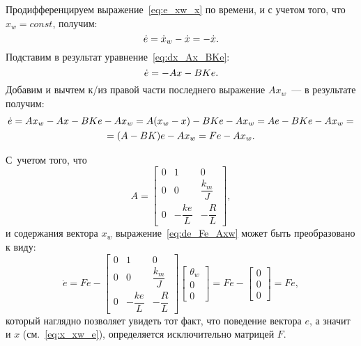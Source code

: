 \documentclass[12pt,a4paper,openany]{extarticle}
\begin{document}
Продифференцируем выражение~\eqref{eq:e_xw_x} по времени, и с учетом того, что $x_w=const$, получим:
\begin{equation}
\dot{e} = \dot{x}_w - \dot{x} = -\dot{x}\ldotp
\end{equation}
Подставим в результат уравнение~\eqref{eq:dx_Ax_BKe}:
\begin{equation}
\dot{e} = -Ax-BKe\ldotp
\end{equation}
Добавим и вычтем к/из правой части последнего выражение $Ax_w$~--- в результате получим:
\begin{multline}\label{eq:de_Fe_Axw}
\dot{e} = Ax_w-Ax-BKe -Ax_w = A(x_w-x)-BKe-Ax_w =  Ae-BKe - Ax_w =\\= (A-BK)e - Ax_w = Fe - Ax_w\ldotp
\end{multline}

С~учетом того, что 
\begin{equation}
A=
\begin{bmatrix}
0 & 1 & 0\\
0 & 0 & \dfrac{k_m}{J}\\
0 & -\dfrac{ke}{L} & -\dfrac{R}{L}
\end{bmatrix}\!\!,
\end{equation} 
и содержания вектора $x_w$ выражение~\eqref{eq:de_Fe_Axw} может быть преобразовано к виду:
\begin{equation}
\dot{e} = Fe-
\begin{bmatrix}
0 & 1 & 0\\
0 & 0 & \dfrac{k_m}{J}\\
0 & -\dfrac{ke}{L} & -\dfrac{R}{L}
\end{bmatrix}
\begin{bmatrix}
\theta_w \\ 0 \\0
\end{bmatrix}
=Fe-
\begin{bmatrix}
0 \\ 0 \\ 0
\end{bmatrix}
=Fe,
\end{equation}
который наглядно позволяет увидеть тот факт, что поведение вектора $e$, а значит и $x$ (см.~\eqref{eq:x_xw_e}), определяется исключительно матрицей $F$.
\end{document}
